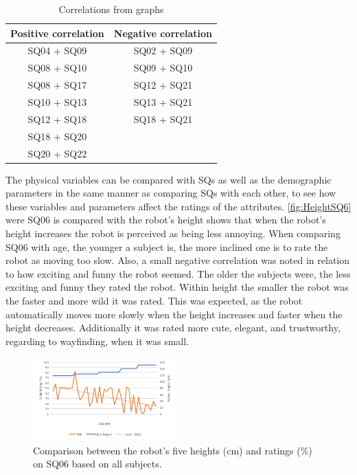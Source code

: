 \noindent
%
\begin{table}
	\centering
	\caption{Correlations from graphs}
	\label{tab:CorrelationsFromGraphs} 
	\begin{tabular}{ c|c }
		\centering
		Positive correlation & Negative correlation \\ \hline
		SQ04 + SQ09 & SQ02 + SQ09 \\ 
		SQ08 + SQ10 & SQ09 + SQ10 \\ 
		SQ08 + SQ17 & SQ12 + SQ21 \\ 
		SQ10 + SQ13 & SQ13 + SQ21 \\ 
		SQ12 + SQ18 & SQ18 + SQ21	\\	
		SQ18 + SQ20 & 			\\
		SQ20 + SQ22 & 
	\end{tabular}        
\end{table}
\noindent
%
The physical variables can be compared with SQs as well as the demographic parameters in the same manner as comparing SQs with each other, to see how these variables and parameters affect the ratings of the attributes. \autoref{fig:HeightSQ6} were SQ06 is compared with the robot's height shows that when the robot's height increases the robot is perceived as being less annoying. When comparing SQ06 with age, the younger a subject is, the more inclined one is to rate the robot as moving too slow. Also, a small negative correlation was noted in relation to how exciting and funny the robot seemed. The older the subjects were, the less exciting and funny they rated the robot. Within height the smaller the robot was the faster and more wild it was rated. This was expected, as the robot automatically moves more slowly when the height increases and faster when the height decreases. Additionally it was rated more cute, elegant, and trustworthy, regarding to wayfinding, when it was small.
%
\begin{figure}[H]
	\centering
	\includegraphics[width = 0.49\textwidth]{Figure/HeightSQ6}
	\setlength{} 
	\caption{Comparison between the robot's five heights (cm) and ratings (\%) on SQ06 based on all subjects.}
	\label{fig:HeightSQ6}
\end{figure}
\noindent
%

